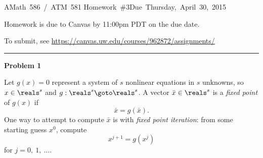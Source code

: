 \documentclass[10pt]{article}
\begin{document}
\hfill\vbox{\hbox{AMath 586 / ATM 581}
\hbox{Homework \#3}\hbox{Due Thursday, April 30, 2015}}

\vskip 5pt

Homework is due to Canvas by 11:00pm PDT on the due date.

To submit, see \url{https://canvas.uw.edu/courses/962872/assignments/}


\vskip 1cm
\hrule
{\bf Problem 1}  


Let $g(x)=0$ represent a system of $s$ nonlinear equations in $s$ unknowns,
so $x\in\reals^s$ and $g: \reals^s \goto \reals^s$.  A vector $\bar
x\in\reals^s$ is a {\em fixed point} of $g(x)$ if 
\begin{equation}\label{a}
\bar x = g(\bar x).
\end{equation}
One way to attempt to compute $\bar x$ is with {\em fixed point iteration}:
from some starting guess $x^0$, compute
\begin{equation}\label{b}
x^{j+1} = g(x^j)
\end{equation}
for $j=0,~1,~\ldots$.
\end{document}
